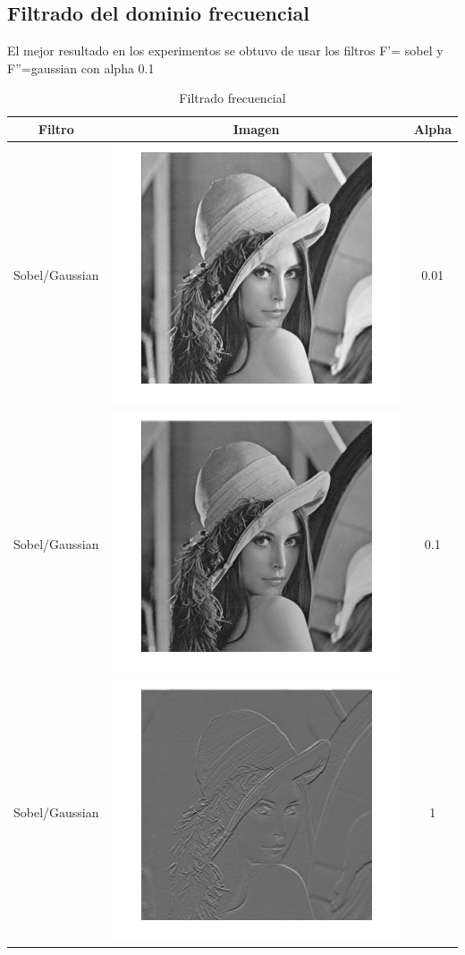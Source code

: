 \documentclass[10pt, a4paper, spanish]{article}  	%
\begin{document}
\subsection{Filtrado del dominio frecuencial}
El mejor resultado en los experimentos se obtuvo de usar los filtros F'= sobel y F''=gaussian con alpha 0.1
\begin{table}[h!]
\caption{Filtrado frecuencial}
\begin{tabular}{|c|c|c|}
\hline
Filtro & Imagen & Alpha \\
\hline
Sobel/Gaussian & 	\includegraphics[width=0.25\linewidth]{lenaFreq1} & 0.01\\ 
\hline
Sobel/Gaussian & 	\includegraphics[width=0.25\linewidth]{lenaFreq2} & 0.1 \\
\hline
Sobel/Gaussian & 	\includegraphics[width=0.25\linewidth]{lenaFreq3} & 1\\
\hline
\end{tabular}
\label{default}
\end{table}
\end{document}
